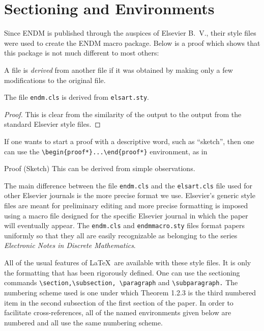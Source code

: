 \documentclass{endm}
\begin{document}
\section{Sectioning and Environments}

Since ENDM is published through the auspices of Elsevier B.~V., their
style files were used to create the ENDM macro package. Below is a
proof which shows that this package is not much different to most
others:

\begin{definition}
A file is \emph{derived} from another file if it was obtained by making
only a few modifications to the original file.
\end{definition}

\begin{theorem}
The file \texttt{\normalshape endm.cls} is derived from
\texttt{\normalshape elsart.sty}.
\end{theorem}

\begin{proof}
This is clear from the similarity of the output to the output from the
standard Elsevier style files.
\end{proof}

If one wants to start a proof with a descriptive word, such as
``sketch'', then one can use the \verb+\begin{proof*}...\end{proof*}+
environment, as in

\begin{proof*}{Proof (Sketch)}
This can be derived from simple observations.
\end{proof*}

The main difference between the file \texttt{endm.cls} and the
\texttt{elsart.cls} file used for other Elsevier journals is the more
precise format we use. Elsevier's generic style files are meant for
preliminary editing and more precise formatting is imposed using a macro
file designed for the specific Elsevier journal in which the paper will
eventually appear. The \texttt{endm.cls} and \texttt{endmmacro.sty} files
format papers uniformly so that they all are easily recognizable as
belonging to the series \emph{Electronic Notes in Discrete Mathematics}.

All of the usual features of \LaTeX\ are available with these style files.
It is only the formatting that has been rigorously defined. One can use
the sectioning commands \verb+\section,\subsection, \paragraph+
and \verb+\subparagraph.+ The numbering scheme used is one under which
Theorem 1.2.3 is the third numbered item in the second subsection of the
first section of the paper. In order to facilitate cross-references, all
of the named environments given below are numbered and all use the same
numbering scheme.
\end{document}
